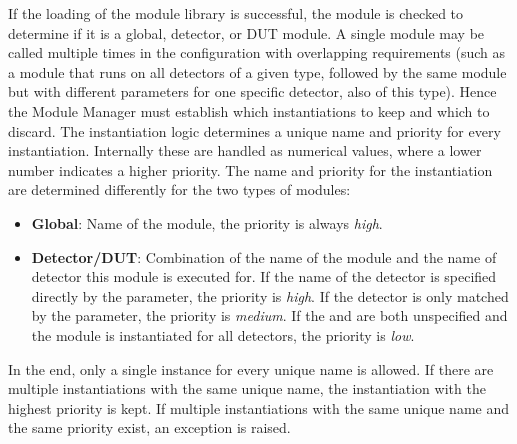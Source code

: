 If the loading of the module library is successful, the module is checked to determine if it is a global, detector, or DUT module.
A single module may be called multiple times in the configuration with overlapping requirements (such as a module that runs on all detectors of a given type, followed by the same module but with different parameters for one specific detector, also of this type). Hence the Module Manager must establish which instantiations to keep and which to discard.
The instantiation logic determines a unique name and priority for every instantiation. Internally these are handled as numerical values, where a lower number indicates a higher priority.
The name and priority for the instantiation are determined differently for the two types of modules:
\begin{itemize}
\item \textbf{Global}: Name of the module, the priority is always \emph{high}.
\item \textbf{Detector/DUT}: Combination of the name of the module and the name of detector this module is executed for.
If the name of the detector is specified directly by the  parameter, the priority is \emph{high}.
If the detector is only matched by the  parameter, the priority is \emph{medium}.
If the  and  are both unspecified and the module is instantiated for all detectors, the priority is \emph{low}.
\end{itemize}
In the end, only a single instance for every unique name is allowed.
If there are multiple instantiations with the same unique name, the instantiation with the highest priority is kept.
If multiple instantiations with the same unique name and the same priority exist, an exception is raised.

